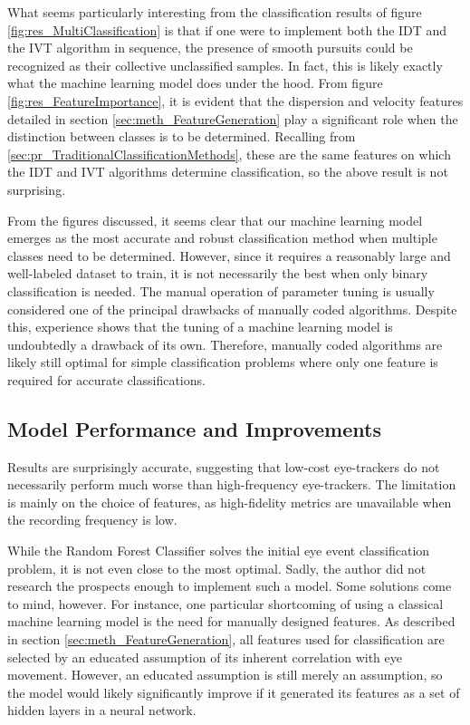 What seems particularly interesting from the classification results of figure \ref{fig:res_MultiClassification} is that if one were to implement both the IDT and the IVT algorithm in sequence, the presence of smooth pursuits could be recognized as their collective unclassified samples. In fact, this is likely exactly what the machine learning model does under the hood. From figure \ref{fig:res_FeatureImportance}, it is evident that the dispersion and velocity features detailed in section \ref{sec:meth_FeatureGeneration} play a significant role when the distinction between classes is to be determined. Recalling from \ref{sec:pr_TraditionalClassificationMethods}, these are the same features on which the IDT and IVT algorithms determine classification, so the above result is not surprising. 

From the figures discussed, it seems clear that our machine learning model emerges as the most accurate and robust classification method when multiple classes need to be determined. However, since it requires a reasonably large and well-labeled dataset to train, it is not necessarily the best when only binary classification is needed. The manual operation of parameter tuning is usually considered one of the principal drawbacks of manually coded algorithms. Despite this, experience shows that the tuning of a machine learning model is undoubtedly a drawback of its own. Therefore, manually coded algorithms are likely still optimal for simple classification problems where only one feature is required for accurate classifications.

\subsection{Model Performance and Improvements}
Results are surprisingly accurate, suggesting that low-cost eye-trackers do not necessarily perform much worse than high-frequency eye-trackers. The limitation is mainly on the choice of features, as high-fidelity metrics are unavailable when the recording frequency is low.

While the Random Forest Classifier solves the initial eye event classification problem, it is not even close to the most optimal. Sadly, the author did not research the prospects enough to implement such a model. Some solutions come to mind, however. For instance, one particular shortcoming of using a classical machine learning model is the need for manually designed features. As described in section \ref{sec:meth_FeatureGeneration}, all features used for classification are selected by an educated assumption of its inherent correlation with eye movement. However, an educated assumption is still merely an assumption, so the model would likely significantly improve if it generated its features as a set of hidden layers in a neural network.

